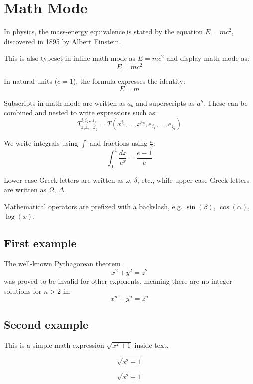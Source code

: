 \documentclass[12pt, letterpaper]{article}
\begin{document}
\vspace{20pt}

\section{Math Mode}

In physics, the mass-energy equivalence is stated by the equation $E=mc^2$, discovered in 1895 by Albert Einstein.

This is also typeset in inline math mode as $E=mc^2$ and display math mode as:
\[
E = mc^2
\]

In natural units ($c = 1$), the formula expresses the identity:
\begin{equation}
E = m
\end{equation}

Subscripts in math mode are written as $a_b$ and superscripts as $a^b$. These can be combined and nested to write expressions such as:
\[
T^{i_1 i_2 \dots i_p}_{j_1 j_2 \dots j_q} = T(x^{i_1}, \dots, x^{i_p}, e_{j_1}, \dots, e_{j_q})
\]

We write integrals using $\int$ and fractions using $\frac{a}{b}$:
\[
\int_0^1 \frac{dx}{e^x} = \frac{e-1}{e}
\]

Lower case Greek letters are written as $\omega$, $\delta$, etc., while upper case Greek letters are written as $\Omega$, $\Delta$.

Mathematical operators are prefixed with a backslash, e.g. $\sin(\beta)$, $\cos(\alpha)$, $\log(x)$.

\subsection{First example}

The well-known Pythagorean theorem
\[x^2 + y^2 = z^2\]
was proved to be invalid for other exponents, meaning there are no integer solutions for $n > 2$ in:
\[x^n + y^n = z^n\]

\subsection{Second example}

This is a simple math expression $\sqrt{x^2+1}$ inside text.

\begin{displaymath}
\sqrt{x^2+1}
\end{displaymath}

\begin{equation*}
\sqrt{x^2+1}
\end{equation*}
\end{document}
